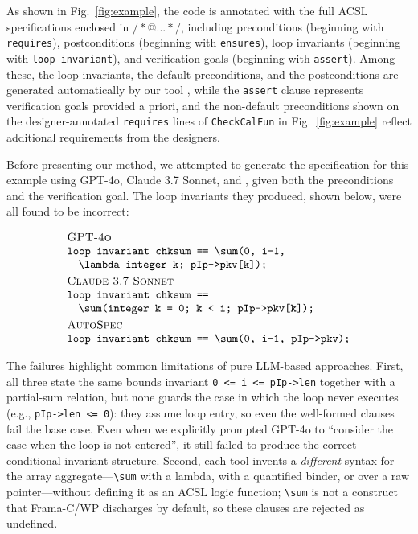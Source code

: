 As shown in Fig.~\ref{fig:example}, the code is annotated with the full ACSL specifications enclosed in $/*@ ... */$, including preconditions (beginning with \texttt{requires}), postconditions (beginning with \texttt{ensures}), loop invariants (beginning with \texttt{loop\ invariant}), and verification goals (beginning with \texttt{assert}).
Among these, the loop invariants, the default preconditions, and the postconditions are generated automatically by our tool \toolname, while the \texttt{assert} clause represents verification goals provided a priori, and the non-default preconditions shown on the designer-annotated \texttt{requires} lines of \texttt{CheckCalFun} in Fig.~\ref{fig:example} reflect additional requirements from the designers.


Before presenting our method, we attempted to generate the specification for this example using GPT-4o, Claude 3.7 Sonnet, and \autospec, given both the preconditions and the verification goal. The loop invariants they produced, shown below, were all found to be incorrect:

{\footnotesize
\[
\begin{array}{@{}l@{}}
\textsc{GPT-4o}\\
\texttt{loop invariant chksum == \textbackslash sum(0, i-1,}\\
\quad\texttt{\textbackslash lambda integer k; pIp->pkv[k]);}\\[3pt]
\textsc{Claude 3.7 Sonnet}\\
\texttt{loop invariant chksum ==}\\
\quad\texttt{\textbackslash sum(integer k = 0; k < i; pIp->pkv[k]);}\\[3pt]
\autospec\\
\texttt{loop invariant chksum == \textbackslash sum(0, i-1, pIp->pkv);}
\end{array}
\]
}

The failures highlight common limitations of pure LLM-based approaches. First, all three state the same bounds invariant \texttt{0 <= i <= pIp->len} together with a partial-sum relation, but none guards the case in which the loop never executes (e.g., \texttt{pIp->len <= 0}): they assume loop entry, so even the well-formed clauses fail the base case. Even when we explicitly prompted GPT-4o to ``consider the case when the loop is not entered'', it still failed to produce the correct conditional invariant structure. Second, each tool invents a \emph{different} syntax for the array aggregate---\texttt{\textbackslash sum} with a lambda, with a quantified binder, or over a raw pointer---without defining it as an ACSL logic function; \texttt{\textbackslash sum} is not a construct that Frama-C/WP discharges by default, so these clauses are rejected as undefined.
 

 

 


 
